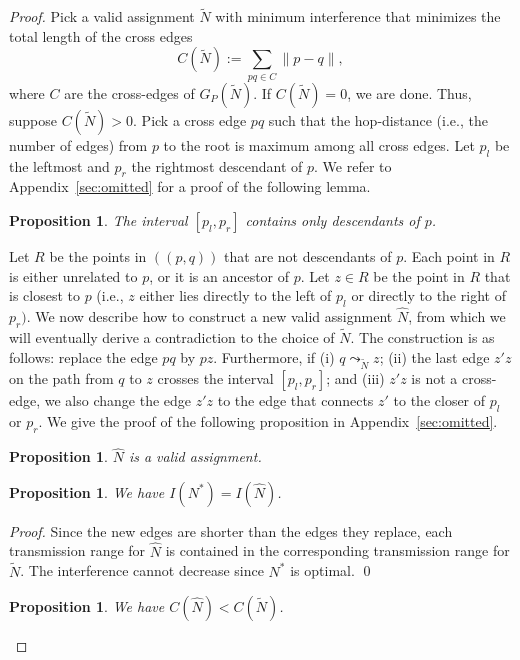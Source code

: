 \documentclass[envcountsect,envcountsame,runningheads,a4paper]{llncs}
\newtheorem{prop}[theorem]{Proposition}
\newcommand{\eqdef}{:=}
\begin{document}
\begin{proof}
Pick a valid assignment
$\widetilde{N}$ with minimum interference that minimizes the total
length of the cross edges
\[
C(\widetilde{N}) \eqdef \sum_{pq \in C} \|p-q\|,
\]
where $C$ are the cross-edges of $G_P(\widetilde{N})$.
If $C(\widetilde{N}) = 0$, we are done.
Thus, suppose $C(\widetilde{N}) > 0$. Pick a cross edge $pq$ such that
the hop-distance (i.e., the number of edges) from $p$ to the root
is maximum among all cross edges.
Let $p_l$ be the leftmost and $p_r$ the rightmost descendant of $p$. We refer 
to Appendix~\ref{sec:omitted} for a proof of the following lemma.

\begin{prop}\label{prop:descendants}
The interval $[p_l, p_r]$ contains only descendants of $p$.
\end{prop}

Let $R$ be the points in $((p,q))$ that
are not descendants of $p$. Each point in $R$
is either unrelated to $p$, or it is an ancestor of $p$.
Let $z \in R$ be the point in $R$ that is closest
to $p$ (i.e.,  $z$ either lies directly to the left of $p_l$ or directly
to the right of $p_r)$.
We now describe how to construct a new valid assignment $\widehat{N}$,
from which we will eventually derive a contradiction to the choice of
$\widetilde{N}$.
The construction is as follows:
replace the edge $pq$ by $pz$. Furthermore, if
(i) $q \leadsto_{\widetilde{N}} z$;
(ii) the last edge  $z'z$ on the path
from $q$ to $z$ crosses the interval $[p_l, p_r]$; and (iii)
$z'z$ is not a cross-edge, we also
change the edge $z' z$ to the edge that connects $z'$ to the
closer of $p_l$ or $p_r$. We give the proof of the following proposition in Appendix~\ref{sec:omitted}.

\begin{prop}\label{clm:validass}
$\widehat{N}$ is a valid assignment.
\end{prop}


\begin{prop}\label{clm:optass}
We have $I(N^*) = I(\widehat{N})$.
\end{prop}

\begin{proof}
Since the new edges are shorter than the edges they replace, each
transmission range for $\widehat{N}$ is contained in the corresponding
transmission range for $\widetilde{N}$. The interference cannot decrease since $N^*$ is
optimal.
\qed{}
\end{proof}

\begin{prop}\label{clm:lesscross}
We have $C(\widehat{N}) < C(\widetilde{N})$.
\end{prop}


\end{proof}
\end{document}
